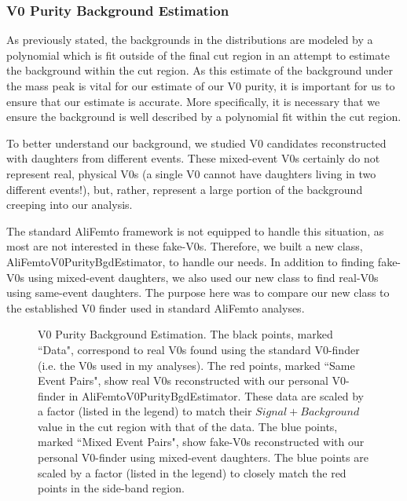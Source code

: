 \documentclass[/home/jesse/Analysis/FemtoAnalysis/AnalysisNotes/AnalysisNoteJBuxton.tex]{subfiles}
\begin{document}
\subsubsection{V0 Purity Background Estimation}
\label{V0PurBgdEst}

As previously stated, the backgrounds in the \minv distributions are modeled by a polynomial which is fit outside of the final cut region in an attempt to estimate the background within the cut region.  
As this estimate of the background under the mass peak is vital for our estimate of our V0 purity, it is important for us to ensure that our estimate is accurate.  
More specifically, it is necessary that we ensure the background is well described by a polynomial fit within the cut region.

To better understand our background, we studied V0 candidates reconstructed with daughters from different events.  
These mixed-event V0s certainly do not represent real, physical V0s (a single V0 cannot have daughters living in two different events!), but, rather, represent a large portion of the background creeping into our analysis.

The standard AliFemto framework is not equipped to handle this situation, as most are not interested in these fake-V0s.  
Therefore, we built a new class, AliFemtoV0PurityBgdEstimator, to handle our needs.  
In addition to finding fake-V0s using mixed-event daughters, we also used our new class to find real-V0s using same-event daughters.  
The purpose here was to compare our new class to the established V0 finder used in standard AliFemto analyses.


\begin{figure}[h!]
  \centering
  \caption[V0 Purity Background Estimation]
  {
  V0 Purity Background Estimation.  
  The black points, marked ``Data", correspond to real V0s found using the standard V0-finder (i.e. the V0s used in my analyses).  
  The red points, marked ``Same Event Pairs", show real V0s reconstructed with our personal V0-finder in AliFemtoV0PurityBgdEstimator.
  These data are scaled by a factor (listed in the legend) to match their $Signal+Background$ value in the cut region with that of the data.  
  The blue points, marked ``Mixed Event Pairs", show fake-V0s reconstructed with our personal V0-finder using mixed-event daughters.  
  The blue points are scaled by a factor (listed in the legend) to closely match the red points in the side-band region.
  }
  \label{fig:V0PurBgdEst}
\end{figure}
\end{document}
